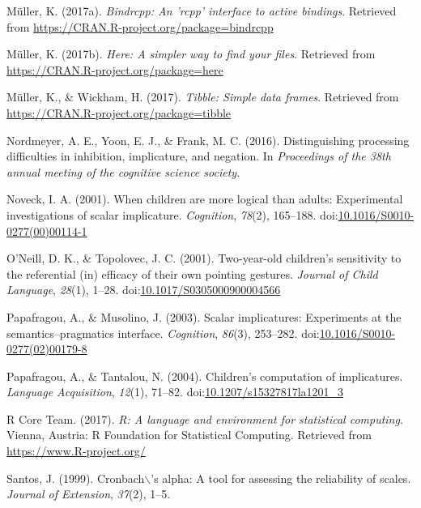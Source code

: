 \documentclass[mask,man]{apa6}
\begin{document}
\hypertarget{ref-R-bindrcpp}{}
Müller, K. (2017a). \emph{Bindrcpp: An 'rcpp' interface to active
bindings}. Retrieved from
\url{https://CRAN.R-project.org/package=bindrcpp}

\hypertarget{ref-R-here}{}
Müller, K. (2017b). \emph{Here: A simpler way to find your files}.
Retrieved from \url{https://CRAN.R-project.org/package=here}

\hypertarget{ref-R-tibble}{}
Müller, K., \& Wickham, H. (2017). \emph{Tibble: Simple data frames}.
Retrieved from \url{https://CRAN.R-project.org/package=tibble}

\hypertarget{ref-nordmeyer2016}{}
Nordmeyer, A. E., Yoon, E. J., \& Frank, M. C. (2016). Distinguishing
processing difficulties in inhibition, implicature, and negation. In
\emph{Proceedings of the 38th annual meeting of the cognitive science
society}.

\hypertarget{ref-noveck2001}{}
Noveck, I. A. (2001). When children are more logical than adults:
Experimental investigations of scalar implicature. \emph{Cognition},
\emph{78}(2), 165--188.
doi:\href{https://doi.org/10.1016/S0010-0277(00)00114-1}{10.1016/S0010-0277(00)00114-1}

\hypertarget{ref-oneill2001}{}
O'Neill, D. K., \& Topolovec, J. C. (2001). Two-year-old children's
sensitivity to the referential (in) efficacy of their own pointing
gestures. \emph{Journal of Child Language}, \emph{28}(1), 1--28.
doi:\href{https://doi.org/10.1017/S0305000900004566}{10.1017/S0305000900004566}

\hypertarget{ref-papafragou2003}{}
Papafragou, A., \& Musolino, J. (2003). Scalar implicatures: Experiments
at the semantics--pragmatics interface. \emph{Cognition}, \emph{86}(3),
253--282.
doi:\href{https://doi.org/10.1016/S0010-0277(02)00179-8}{10.1016/S0010-0277(02)00179-8}

\hypertarget{ref-papafragou2004}{}
Papafragou, A., \& Tantalou, N. (2004). Children's computation of
implicatures. \emph{Language Acquisition}, \emph{12}(1), 71--82.
doi:\href{https://doi.org/10.1207/s15327817la1201_3}{10.1207/s15327817la1201\_3}

\hypertarget{ref-R-base}{}
R Core Team. (2017). \emph{R: A language and environment for statistical
computing}. Vienna, Austria: R Foundation for Statistical Computing.
Retrieved from \url{https://www.R-project.org/}

\hypertarget{ref-santos1999cronbach}{}
Santos, J. (1999). Cronbach\(\backslash\)'s alpha: A tool for assessing
the reliability of scales. \emph{Journal of Extension}, \emph{37}(2),
1--5.
\end{document}
